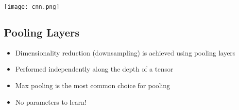 \documentclass[11pt]{article}
\begin{document}
\begin{center}
\texttt{[image: cnn.png]}
\end{center}

\subsection{Pooling Layers}
\begin{itemize}
\item Dimensionality reduction (downsampling) is achieved using pooling layers
\item Performed independently along the depth of a tensor
\item Max pooling is the most common choice for pooling
\item No parameters to learn!
\end{itemize}
\end{document}
